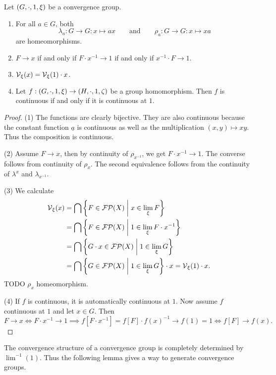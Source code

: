 \begin{lemma} \label{shiftHomeomorphism}
Let $\left( G,\cdot, 1, \xi \right)$ be a convergence group.
\begin{enumerate}
\item For all $a\in G$, both
\[ \lambda_a: G\to G: x\mapsto ax \qquad\text{and}\qquad \rho_a: G\to G: x\mapsto xa \]
are homeomorphisms.
\item $F \to x$ \textup{if and only if} $F\cdot x^{-1} \to 1$ \textup{if and only if} $x^{-1}\cdot F\to 1$.
\item $\operatorname{\mathcal{V}}_\xi(x) = \operatorname{\mathcal{V}}_\xi(1) \cdot x$.
\item Let $f: \left( G,\cdot, 1, \xi \right) \to \left( H,\cdot, 1, \zeta \right)$ be a group homomorphism. Then $f$ is continuous \textup{if and only if} it is continuous at $1$.
\end{enumerate}
\end{lemma}
\begin{proof}
(1) The functions are clearly bijective. They are also continuous because the constant function $\underline{a}$ is continuous as well as the multiplication $(x,y)\mapsto xy$. Thus the composition is continuous.

(2) Assume $F\to x$, then by continuity of $\rho_{x^{-1}}$, we get $F\cdot x^{-1} \to 1$. The converse follows from continuity of $\rho_x$. The second equivalence follows from the continuity of $\lambda^{x}$ and $\lambda_{x^{-1}}$.

(3) We calculate
\begin{align*}
\operatorname{\mathcal{V}}_\xi(x) &= \bigcap \left\{ F\in \operatorname{\mathcal{FP}}(X) \;\middle|\; x\in \lim_\xi F \right\} \\
&= \bigcap \left\{ F\in \operatorname{\mathcal{FP}}(X) \;\middle|\; 1\in \lim_\xi F\cdot x^{-1} \right\} \\
&= \bigcap \left\{ G\cdot x\in \operatorname{\mathcal{FP}}(X) \;\middle|\; 1\in \lim_\xi G \right\} \\
&= \bigcap \left\{ G\in \operatorname{\mathcal{FP}}(X) \;\middle|\; 1\in \lim_\xi G \right\}\cdot x = \operatorname{\mathcal{V}}_\xi(1)\cdot x.
\end{align*}
TODO $\rho_x$ homeomorphism.

(4) If $f$ is continuous, it is automatically continuous at $1$. Now assume $f$ continuous at $1$ and let $x\in G$. Then
\[ F\to x \iff F\cdot x^{-1} \to 1 \implies f[F\cdot x^{-1}] = f[F]\cdot f(x)^{-1} \to f(1) = 1 \iff f[F] \to f(x). \]
\end{proof}

The convergence structure of a convergence group is completely determined by $\lim^{-1}(1)$. Thus the following lemma gives a way to generate convergence groups.

